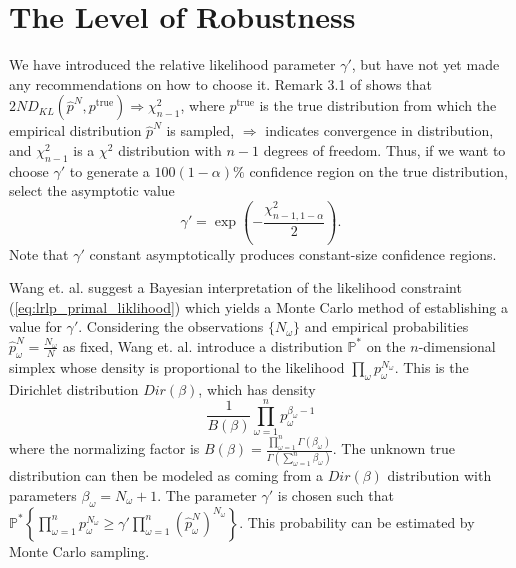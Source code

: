 \documentclass[11pt]{article}
\renewcommand{\P}{\mathbb{P}}
\newcommand{\ptrue}{p^{\text{true}}}
\begin{document}
\section{The Level of Robustness}

We have introduced the relative likelihood parameter $\gamma'$, but have not yet made any recommendations on how to choose it.
Remark 3.1 of \cite{pardo2005statistical} shows that $2ND_{KL}(\hat{p}^N, \ptrue) \Rightarrow \chi^2_{n-1}$, where $\ptrue$ is the true distribution from which the empirical distribution $\hat{p}^N$ is sampled, $\Rightarrow$ indicates convergence in distribution, and $\chi^2_{n-1}$ is a $\chi^2$ distribution with $n-1$ degrees of freedom.
Thus, if we want to choose $\gamma'$ to generate a $100(1-\alpha)\%$ confidence region on the true distribution, select the asymptotic value
\begin{equation} \label{eq:asymptotic_gamma}
	\gamma' = \exp \left( -\frac{\chi^2_{n-1,1-\alpha}}{2} \right).
\end{equation}
Note that $\gamma'$ constant asymptotically produces constant-size confidence regions.

Wang et. al. \cite{wang2010likelihood} suggest a Bayesian interpretation of the likelihood constraint (\ref{eq:lrlp_primal_liklihood}) which yields a Monte Carlo method of establishing a value for $\gamma'$.
Considering the observations $\{N_\omega\}$ and empirical probabilities $\hat{p}^N_\omega = \frac{N_\omega}{N}$ as fixed, Wang et. al. \cite{wang2010likelihood} introduce a distribution $\P^*$ on the $n$-dimensional simplex whose density is proportional to the likelihood $\prod_\omega p_\omega^{N_\omega}$.
This is the Dirichlet distribution $Dir(\beta)$, which has density
\[
	\frac{1}{B(\beta)} \prod_{\omega=1}^n p_\omega^{\beta_\omega-1}
\]
where the normalizing factor is $B(\beta) = \frac{\prod_{\omega=1}^n \Gamma(\beta_\omega)}{\Gamma\left( \sum_{\omega=1}^n \beta_\omega \right)}$.
The unknown true distribution can then be modeled as coming from a $Dir(\beta)$ distribution with parameters $\beta_\omega = N_\omega + 1$.
The parameter $\gamma'$ is chosen such that $\P^*\left\{ \prod_{\omega=1}^n p_\omega^{N_\omega} \geq \gamma' \prod_{\omega=1}^n (\hat{p}^N_\omega)^{N_\omega} \right\}$.
This probability can be estimated by Monte Carlo sampling.
\end{document}
